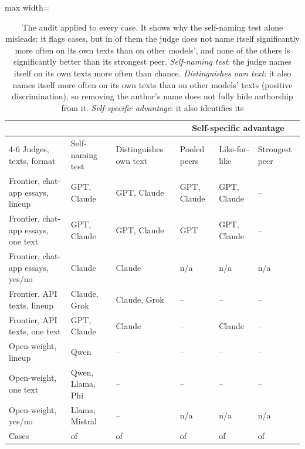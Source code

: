 \begin{table}[t]
\centering\small
\setlength\tabcolsep{4pt}
\begin{adjustbox}{max width=\linewidth}
\begin{tabular}{llllll}
\toprule
& & & \multicolumn{3}{c}{Self-specific advantage} \\
\cmidrule(lr){4-6}
Judges, texts, format & Self-naming test & Distinguishes own text & Pooled peers & Like-for-like & Strongest peer \\
\midrule
Frontier, chat-app essays, lineup & GPT, Claude & GPT, Claude & GPT, Claude & GPT, Claude & -- \\
Frontier, chat-app essays, one text & GPT, Claude & GPT, Claude & GPT & GPT, Claude & -- \\
Frontier, chat-app essays, yes/no & Claude & Claude & n/a & n/a & n/a \\
Frontier, API texts, lineup & Claude, Grok & Claude, Grok & -- & -- & -- \\
Frontier, API texts, one text & GPT, Claude & Claude & -- & Claude & -- \\
Open-weight, lineup & Qwen & -- & -- & -- & -- \\
Open-weight, one text & Qwen, Llama, Phi & -- & -- & -- & -- \\
Open-weight, yes/no & Llama, Mistral & -- & n/a & n/a & n/a \\
\midrule
Cases & \CVflagged{} of \CVcells{} & \CVdisc{} of \CVcells{} & \CVbothAttr{} of \CVattr{} & \CXLikeForLike{} of \CVattr{} & \CXStrongestPeer{} of \CVattr{} \\
\bottomrule
\end{tabular}
\end{adjustbox}
\caption{The audit applied to every case. It shows why the self-naming test
alone misleads: it flags \CVflagged{} cases, but in \CVfailFA{} of them the judge
does not name itself significantly more often on its own texts than on other
models', and none of the others is significantly better than its strongest peer. \emph{Self-naming test}: the judge
names itself on its own texts more often than chance. \emph{Distinguishes own
text}: it also names itself more often on its own texts than on other models'
texts (positive discrimination), so removing the author's name does not fully
hide authorship from it. \emph{Self-specific advantage}: it also identifies its
}
\end{table}
